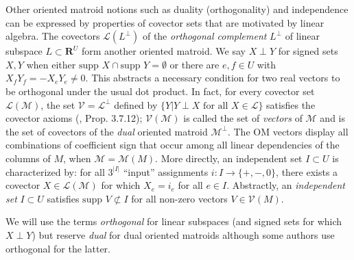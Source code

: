 \documentclass{amsproc-sunycstr}
\def\Reals{\ensuremath{\mathbf R}}
\theoremstyle{plain}
\newtheorem{theorem}{Theorem}
\theoremstyle{definition}
\theoremstyle{remark}
\newcommand{\supp}[1]{{{\mbox{supp\ }#1}}}
\newcommand{\extra}[1]{{{#1}}}
\begin{document}
Other oriented matroid 
notions such as duality (orthogonality) and 
independence can be expressed by properties of covector sets
that are motivated by linear algebra.
The covectors $\mathcal{L}(L^\perp)$ of the 
\textit{orthogonal complement}
$L^\perp$
of linear subspace $L\subset\Reals^U$ form another oriented matroid.
We say $X\perp Y$ for signed sets $X,Y$ when 
either $\supp{X}\cap\supp{Y}=\emptyset$ or
there are $e,f\in U$
with $X_fY_f = -X_eY_e \neq 0$.
This abstracts a necessary condition for 
two real vectors to be orthogonal
under the usual dot product.
In fact, for every 
covector set
$\mathcal{L}(\mathcal{M})$,
the set $\mathcal{V}=\mathcal{L}^\perp$ defined by
$\{Y | Y\perp X \mbox{\ for all\ }X\in\mathcal{L}\}$ satisfies the
covector axioms (\cite{OMBOOK}, Prop. 3.7.12); 
$\mathcal{V}(\mathcal{M})$ is called the 
set of \textit{vectors} of $\mathcal{M}$ and is the set of covectors
of the \textit{dual}  oriented matroid 
$\mathcal{M}^\perp$. The OM vectors display 
all combinations of coefficient 
sign that occur among all linear dependencies of the columns of $M$,
when $\mathcal{M}=\mathcal{M}(M)$.
\extra{More directly, an independent set $I\subset U$ is characterized by: 
for all $3^{|I|}$ ``input'' assignments $i:I\rightarrow\{+,-,0\}$, 
there exists a covector $X\in \mathcal{L}(\mathcal{M})$ for which
$X_e = i_e$ for all $e\in I$.}  Abstractly, an \textit{independent set}
$I\subset U$ satisfies $\supp{V}\not\subset I$ for all non-zero 
vectors $V\in\mathcal{V}(\mathit{M})$.

We will use the terms \textit{orthogonal} for linear subspaces
(and signed sets for which $X\perp Y$)
but reserve \textit{dual} for dual oriented matroids although some authors
use orthogonal for the latter.  %

\end{document}
